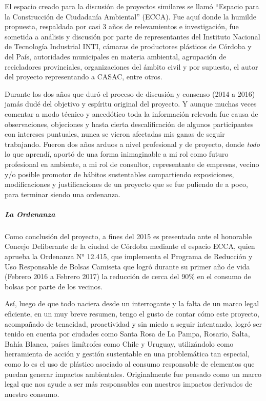 \documentclass[
]{article}
\begin{document}
El espacio creado para la discusión de proyectos similares se llamó
``Espacio para la Construcción de Ciudadanía Ambiental'' (ECCA). Fue
aquí donde la humilde propuesta, respaldada por casi 3 años de
relevamientos e investigación, fue sometida a análisis y discusión por
parte de representantes del Instituto Nacional de Tecnología Industrial
INTI, cámaras de productores plásticos de Córdoba y del País,
autoridades municipales en materia ambiental, agrupación de recicladores
provinciales, organizaciones del ámbito civil y por supuesto, el autor
del proyecto representando a CASAC, entre otros.

Durante los dos años que duró el proceso de discusión y consenso (2014 a
2016) jamás dudé del objetivo y espíritu original del proyecto. Y aunque
muchas veces comentar a modo técnico y anecdótico toda la información
relevada fue causa de observaciones, objeciones y hasta cierta
descalificación de algunos participantes con intereses puntuales, nunca
se vieron afectadas mis ganas de seguir trabajando. Fueron dos años
arduos a nivel profesional y de proyecto, donde \emph{todo} lo que
aprendí, aportó de una forma inimaginable a mi rol como futuro
profesional en ambiente, a mi rol de consultor, representante de
empresas, vecino y/o posible promotor de hábitos sustentables
compartiendo exposiciones, modificaciones y justificaciones de un
proyecto que se fue puliendo de a poco, para terminar siendo una
ordenanza.

\hypertarget{la-ordenanza}{%
\subparagraph{\texorpdfstring{\textbf{La
Ordenanza}}{La Ordenanza}}\label{la-ordenanza}}

Como conclusión del proyecto, a fines del 2015 es presentado ante el
honorable Concejo Deliberante de la ciudad de Córdoba mediante el
espacio ECCA, quien aprueba la Ordenanza N° 12.415, que implementa el
Programa de Reducción y Uso Responsable de Bolsas Camiseta que logró
durante su primer año de vida (Febrero 2016 a Febrero 2017) la reducción
de cerca del 90\% en el consumo de bolsas por parte de los vecinos.

Así, luego de que todo naciera desde un interrogante y la falta de un
marco legal eficiente, en un muy breve resumen, tengo el gusto de contar
cómo este proyecto, acompañado de tenacidad, proactividad y sin miedo a
seguir intentando, logró ser tenido en cuenta por ciudades como Santa
Rosa de La Pampa, Rosario, Salta, Bahía Blanca, países limítrofes como
Chile y Uruguay, utilizándolo como herramienta de acción y gestión
sustentable en una problemática tan especial, como lo es el uso de
plástico asociado al consumo responsable de elementos que puedan generar
impactos ambientales. Originalmente fue pensado como un marco legal que
nos ayude a ser más responsables con nuestros impactos derivados de
nuestro consumo.
\end{document}
